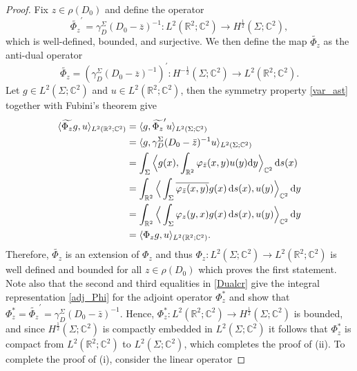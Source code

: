 \documentclass[11pt,a4paper,reqno,oneside]{amsproc}
\def \rr {{\mathbb R}}
\def \cc {{\mathbb C}}
\numberwithin{equation}{section}
\def\var{\varphi}
\def \cc {{\mathbb{C}}}
\begin{document}
\begin{proof} Fix $z\in\rho(D_0)$ and define the  operator 
           \[
		\widetilde{\Phi_{z}}^{\prime}=\gamma_D^\Sigma (D_0-\overline z)^{-1}: L^2(\rr^2; \mathbb{C}^2) \rightarrow H^{\frac{1}{2}}(\Sigma; \mathbb{C}^2),
		\]
      which is well-defined, bounded, and surjective. We then define the map $\widetilde{\Phi_{z}}$ as the anti-dual operator
		\[
		\widetilde{\Phi_{z}}=\left(\gamma_D^\Sigma (D_0-\overline z)^{-1}\right)^{\prime}: H^{-\frac{1}{2}}(\Sigma; \mathbb{C}^2)  \rightarrow L^2(\rr^2; \mathbb{C}^2).
		\]
        Let $g\in L^2(\Sigma; \mathbb{C}^2)$ and $u\in L^2(\rr^2; \mathbb{C}^2)$, then the symmetry property \eqref{var_ast} together with Fubini's theorem give
		\begin{align}\label{Dualcr}
        \begin{split}
			\langle \widetilde{\Phi_{z}}g , u \rangle_{L^2(\rr^2; \mathbb{C}^2)}&=\langle  g, \widetilde{\Phi_{z}}^{\prime} u \rangle_{L^2(\Sigma; \mathbb{C}^2)}\\
			&=\langle  g, \gamma_D^\Sigma (D_0-\Bar z)^{-1} u \rangle_{L^2(\Sigma; \mathbb{C}^2)}\\
			&=  \int_\Sigma \Big\langle g(x), \int_{\rr^2} \var_{\Bar{z}}(x,y)u(y)\mathrm{d} y \Big\rangle_{\cc^2}\,\mathrm{d}s(x)\\
			&=\int_{\rr^2} \Big\langle \int_\Sigma \overline{\var_{\Bar{z}}(x,y)}g(x)\,\mathrm{d}s(x), u(y)\Big\rangle_{\cc^2}\,\mathrm{d}y\\
			&=\int_{\rr^2} \Big\langle \int_\Sigma \var_{z}(y,x)g(x)\, \mathrm{d}s(x), u(y)\Big\rangle_{\cc^2}\,\mathrm{d}y\\
            &=\langle \Phi_{z}g , u \rangle_{L^2(\rr^2; \mathbb{C}^2)}.
            \end{split}
		\end{align}
Therefore, $\widetilde{\Phi_{z}}$ is an extension of $\Phi_z$ and thus $\Phi_z: L^2(\Sigma; \mathbb{C}^2) \rightarrow L^2(\rr^2; \mathbb{C}^2)$ is well defined and bounded for all $z\in\rho(D_0)$ which proves the first statement. Note also that the second and third equalities in \eqref{Dualcr} give the integral representation \eqref{adj_Phi} for the adjoint operator $\Phi_z^\ast$ and show that $\Phi_z^\ast=\widetilde{\Phi_{z}}^{\prime}=\gamma_D^\Sigma (D_0-\bar z)^{-1}$. Hence, $\Phi_z^*: L^2(\rr^2; \mathbb{C}^2) \rightarrow H^{\frac{1}{2}}(\Sigma; \mathbb{C}^2)$ is bounded, and since $H^{\frac{1}{2}}(\Sigma; \mathbb{C}^2)$ is compactly embedded in $L^2(\Sigma; \mathbb{C}^2)$ it follows that $\Phi_z^*$ is compact from $ L^2(\rr^2; \mathbb{C}^2)$ to $L^2(\Sigma; \mathbb{C}^2)$, which completes the proof of (ii). To complete the proof of (i),  consider the linear operator

\end{proof}
\end{document}
